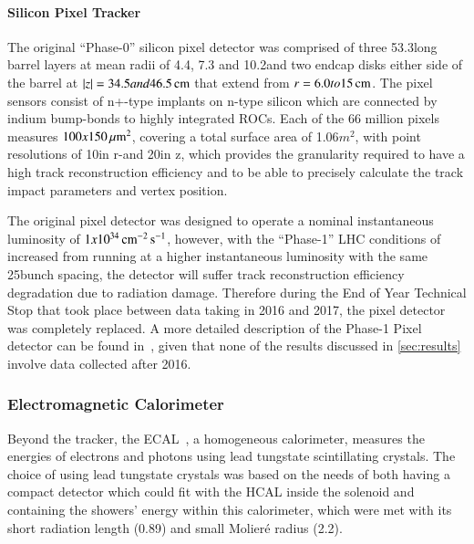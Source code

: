 \paragraph{Silicon Pixel Tracker}
The original ``Phase-0'' silicon pixel detector was comprised of three 53.3\cm long barrel layers at mean radii of 4.4, 7.3 and 10.2\cm and two endcap disks either side of the barrel at $|z| = 34.5 and 46.5\,\text{cm}$ that extend from $r = 6.0 to 15\,\text{cm}$.
The pixel sensors consist of n+-type implants on n-type silicon which are connected by indium bump-bonds to highly integrated ROCs.
Each of the 66 million pixels measures $100x150\,\mu\text{m}^{2}$, covering a total surface area of 1.06$m^{2}$, with point resolutions of 10\mum in r-\phi and 20\mum in z, which provides the granularity required to have a high track reconstruction efficiency and to be able to precisely calculate the track impact parameters and vertex position.

The original pixel detector was designed to operate a nominal instantaneous luminosity of $1x10^{34}\,\text{cm}^\text{$-$2}\,\text{s}^\text{$-$1}$, however, with the ``Phase-1'' LHC conditions of increased \PU from running at a higher instantaneous luminosity with the same 25\ns bunch spacing, the detector will suffer track reconstruction efficiency degradation due to radiation damage.
Therefore during the End of Year Technical Stop that took place between data taking in 2016 and 2017, the pixel detector was completely replaced.
A more detailed description of the Phase-1 Pixel detector can be found in~\cite{CMS:2012sda}, given that none of the results discussed in \ref{sec:results} involve data collected after 2016.

\subsubsection{Electromagnetic Calorimeter}\label{subsubsec:ECAL}
Beyond the tracker, the ECAL~\cite{CMS:1997ysd,CMS:2002xia}, a homogeneous calorimeter, measures the energies of electrons and photons using lead tungstate scintillating crystals. 
The choice of using lead tungstate crystals was based on the needs of both having a compact detector which could fit with the HCAL inside the solenoid and containing the showers' energy within this calorimeter, which were met with its short radiation length (0.89\cm) and small Molier\'{e} radius (2.2\cm).

